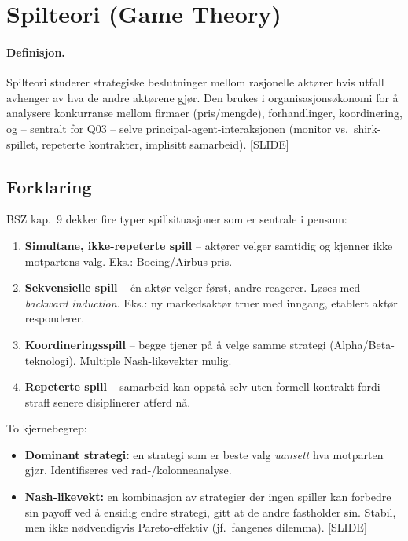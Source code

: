 \section{Spilteori (Game Theory)}\label{thr:game-theory}

\paragraph{Definisjon.} Spilteori studerer strategiske beslutninger mellom rasjonelle aktører hvis utfall avhenger av hva de andre aktørene gjør. Den brukes i organisasjons\-økonomi for å analysere konkurranse mellom firmaer (pris/mengde), forhandlinger, koordinering, og -- sentralt for Q03 -- selve principal-agent-interaksjonen (monitor vs.\ shirk-spillet, repeterte kontrakter, implisitt samarbeid). [SLIDE]

\subsection*{Forklaring}

BSZ kap.~9 dekker fire typer spillsituasjoner som er sentrale i pensum:
\begin{enumerate}
\item \textbf{Simultane, ikke-repeterte spill} -- aktører velger samtidig og kjenner ikke motpartens valg. Eks.: Boeing/Airbus pris.
\item \textbf{Sekvensielle spill} -- én aktør velger først, andre reagerer. Løses med \emph{backward induction}. Eks.: ny markedsaktør truer med inngang, etablert aktør responderer.
\item \textbf{Koordinerings\-spill} -- begge tjener på å velge samme strategi (Alpha/Beta-teknologi). Multiple Nash-likevekter mulig.
\item \textbf{Repeterte spill} -- samarbeid kan oppstå selv uten formell kontrakt fordi straff senere disiplinerer atferd nå.
\end{enumerate}

To kjernebegrep:
\begin{itemize}
\item \textbf{Dominant strategi:} en strategi som er beste valg \emph{uansett} hva motparten gjør. Identifiseres ved rad-/kolonneanalyse.
\item \textbf{Nash-likevekt:} en kombinasjon av strategier der ingen spiller kan forbedre sin payoff ved å ensidig endre strategi, gitt at de andre fastholder sin. Stabil, men ikke nødvendigvis Pareto-effektiv (jf.\ fangenes dilemma). [SLIDE]
\end{itemize}

